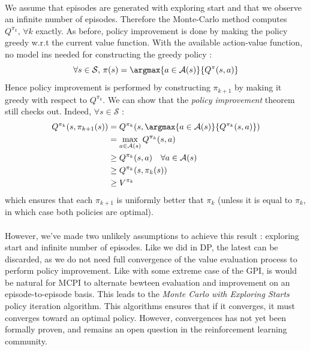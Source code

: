 \documentclass[a4paper]{article}
\begin{document}
{{{				\paragraph{} We assume that episodes are generated with exploring start and that we observe an infinite number of episodes. Therefore the Monte-Carlo method computes $Q^{\pi_k},\, \forall{k}$ exactly. As before, policy improvement is done by making the policy greedy w.r.t the current value function. With the available action-value function, no model ins needed for constructing the greedy policy : 
				\begin{equation}
					\forall s\in\mathcal{S}, \, \pi(s) = \argmax{a\in\mathcal{A}(s)}{Q^\pi(s,a)}
				\end{equation}
				Hence policy improvement is performed by constructing $\pi_{k+1}$ by making it greedy with respect to $Q^{\pi_k}$. We can show that the \emph{policy improvement} theorem still checks out. Indeed, $\forall{s}\in\mathcal{S}$ : 
				\begin{equation}
					\begin{aligned}
						Q^{\pi_k}(s,\pi_{k+1}(s)) &= Q^{\pi_k}(s,\argmax{a\in\mathcal{A}(s)}{Q^{\pi_k}(s,a)})\\
										      &= \max_{a\in\mathcal{A}(s)} Q^{\pi_k}(s,a)\\
										      &\geq Q^{\pi_k}(s,a) \quad \forall a\in\mathcal{A}(s) \\	
										      &\geq Q^{\pi_k}(s,\pi_k(s))\\
										      & \geq V^{\pi_k}
					\end{aligned}
				\end{equation}
				which ensures that each $\pi_{k+1}$ is uniformly better that $\pi_k$ (unless it is equal to $\pi_k$, in which case both policies are optimal). 
				
				\paragraph{} However, we've made two unlikely assumptions to achieve this result : exploring start and infinite number of episodes. Like we did in DP, the latest can be discarded, as we do not need full convergence of the value evaluation process to perform policy improvement. Like with some extreme case of the GPI, is would be natural for MCPI to alternate bewteen evaluation and improvement on an episode-to-episode basis. This leads to the \emph{Monte Carlo with Exploring Starts} policy iteration algorithm. This algorithms ensures that if it converges, it must converges toward an optimal policy. However, convergences has not yet been formally proven, and remains an open question in the reinforcement learning community. 
				
}}}
\end{document}
